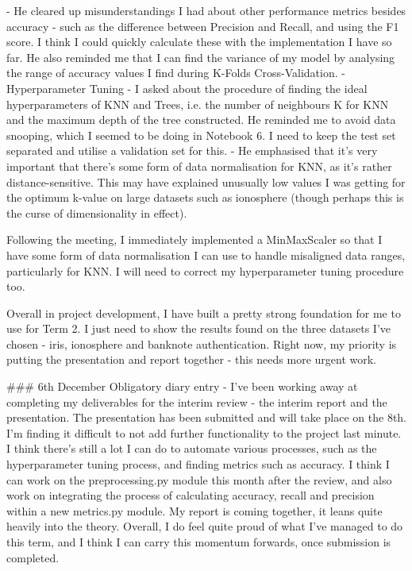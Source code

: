 \documentclass[letterpaper,10pt]{article}
\begin{document}
\begin{markdown}
- He cleared up misunderstandings I had about other performance metrics besides accuracy - such as the difference between Precision and Recall, and using the F1 score. I think I could quickly calculate these with the implementation I have so far. He also reminded me that I can find the variance of my model by analysing the range of accuracy values I find during K-Folds Cross-Validation.  
- Hyperparameter Tuning - I asked about the procedure of finding the ideal hyperparameters of KNN and Trees, i.e. the number of neighbours K for KNN and the maximum depth of the tree constructed. He reminded me to avoid data snooping, which I seemed to be doing in Notebook 6. I need to keep the test set separated and utilise a validation set for this.  
- He emphasised that it's very important that there's some form of data normalisation for KNN, as it's rather distance-sensitive. This may have explained unusually low values I was getting for the optimum k-value on large datasets such as ionosphere (though perhaps this is the curse of dimensionality in effect).  
  
Following the meeting, I immediately implemented a MinMaxScaler so that I have some form of data normalisation I can use to handle misaligned data ranges, particularly for KNN. I will need to correct my hyperparameter tuning procedure too.  

Overall in project development, I have built a pretty strong foundation for me to use for Term 2. I just need to show the results found on the three datasets I've chosen - iris, ionosphere and banknote authentication.  
Right now, my priority is putting the presentation and report together - this needs more urgent work. 

### 6th December
Obligatory diary entry - I've been working away at completing my deliverables for the interim review - the interim report and the presentation. The presentation has been submitted and will take place on the 8th.  
I'm finding it difficult to not add further functionality to the project last minute. I think there's still a lot I can do to automate various processes, such as the hyperparameter tuning process, and finding metrics such as accuracy. I think I can work on the preprocessing.py module this month after the review, and also work on integrating the process of calculating accuracy, recall and precision within a new metrics.py module.  
My report is coming together, it leans quite heavily into the theory. Overall, I do feel quite proud of what I've managed to do this term, and I think I can carry this momentum forwards, once submission is completed.

\end{markdown}
\end{document}
